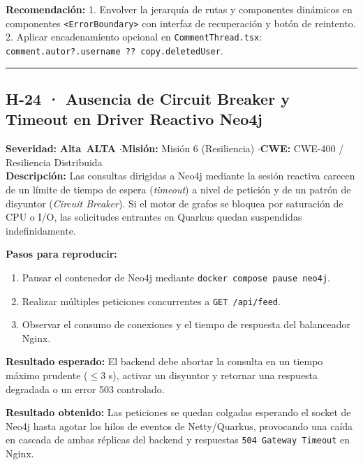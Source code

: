 \documentclass[10pt,a4paper]{article}
\newcommand{\code}[1]{\nolinkurl{#1}}
\newcommand{\badgeAlta}{\colorbox{orange!20}{\textcolor{orange!90!black}{\textbf{\footnotesize Alta}}}}
\begin{document}
\noindent\textbf{Recomendación:}
1. Envolver la jerarquía de rutas y componentes dinámicos en componentes \code{<ErrorBoundary>} con interfaz de recuperación y botón de reintento.\\
2. Aplicar encadenamiento opcional en \code{CommentThread.tsx}: \code{comment.autor?.username ?? copy.deletedUser}.

\vspace{0.8em}
\hrule
\vspace{0.8em}

\subsection{H-24 · Ausencia de Circuit Breaker y Timeout en Driver Reactivo Neo4j}
\noindent\textbf{Severidad:} \badgeAlta\ \textbf{ALTA} \quad$\cdot$\quad \textbf{Misión:} Misión 6 (Resiliencia) \quad$\cdot$\quad \textbf{CWE:} CWE-400 / Resiliencia Distribuida\\[0.3em]

\noindent\textbf{Descripción:}
Las consultas dirigidas a Neo4j mediante la sesión reactiva carecen de un límite de tiempo de espera (\textit{timeout}) a nivel de petición y de un patrón de disyuntor (\textit{Circuit Breaker}). Si el motor de grafos se bloquea por saturación de CPU o I/O, las solicitudes entrantes en Quarkus quedan suspendidas indefinidamente.

\noindent\textbf{Pasos para reproducir:}
\begin{enumerate}[leftmargin=*]
    \item Pausar el contenedor de Neo4j mediante \code{docker compose pause neo4j}.
    \item Realizar múltiples peticiones concurrentes a \code{GET /api/feed}.
    \item Observar el consumo de conexiones y el tiempo de respuesta del balanceador Nginx.
\end{enumerate}

\noindent\textbf{Resultado esperado:}
El backend debe abortar la consulta en un tiempo máximo prudente ($\le 3$ s), activar un disyuntor y retornar una respuesta degradada o un error 503 controlado.

\noindent\textbf{Resultado obtenido:}
Las peticiones se quedan colgadas esperando el socket de Neo4j hasta agotar los hilos de eventos de Netty/Quarkus, provocando una caída en cascada de ambas réplicas del backend y respuestas \texttt{504 Gateway Timeout} en Nginx.
\end{document}
